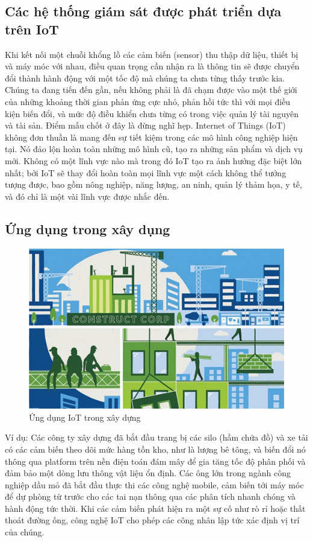 \subsection{Các hệ thống giám sát được phát triển dựa trên IoT}
Khi kết nối một chuỗi khổng lồ các cảm biến (sensor) thu thập dữ liệu, thiết bị và máy móc với nhau, điều quan trọng cần nhận ra là thông tin sẽ được chuyển đổi thành hành động với một tốc độ mà chúng ta chưa từng thấy trước kia. Chúng ta đang tiến đến gần, nếu không phải là đã chạm được vào một thế giới của những khoảng thời gian phản ứng cực nhỏ, phản hồi tức thì với mọi điều kiện biến đổi, và mức độ điều khiển chưa từng có trong việc quản lý tài nguyên và tài sản.
Điểm mấu chốt ở đây là đừng nghĩ hẹp. Internet of Things (IoT) không đơn thuần là mang đến sự tiết kiệm trong các mô hình công nghiệp hiện tại. Nó đảo lộn hoàn toàn những mô hình cũ, tạo ra những sản phẩm và dịch vụ mới. Không có một lĩnh vực nào mà trong đó IoT tạo ra ảnh hưởng đặc biệt lớn nhất; bởi IoT sẽ thay đổi hoàn toàn mọi lĩnh vực một cách không thể tưởng tượng được, bao gồm nông nghiệp, năng lượng, an ninh, quản lý thảm họa, y tế, và đó chỉ là một vài lĩnh vực được nhắc đến.

\subsection*{Ứng dụng trong xây dụng }
\begin{figure}[htbp!] 
\centering    
\includegraphics[width=1\textwidth]{pic8}
\caption[Ứng dụng IoT trong xây dựng ]{Ứng dụng IoT trong xây dựng }
\label{fig:pic8}
\end{figure}

Ví dụ: Các công ty xây dựng đã bắt đầu trang bị các silo (hầm chứa đồ) và xe tải có các cảm biến theo dõi mức hàng tồn kho, như là lượng bê tông, và biến đổi nó thông qua platform trên nền điện toán đám mây để gia tăng tốc độ phân phối và đảm bảo một dòng lưu thông vật liệu ổn định. Các ông lớn trong ngành công nghiệp dầu mỏ đã bắt đầu thực thi các công nghệ mobile, cảm biến tới máy móc để dự phòng từ trước cho các tai nạn thông qua các phân tích nhanh chóng và hành động tức thời. Khi các cảm biến phát hiện ra một sự cố như rò rỉ hoặc thất thoát đường ống, công nghệ IoT cho phép các công nhân lập tức xác định vị trí của chúng.

